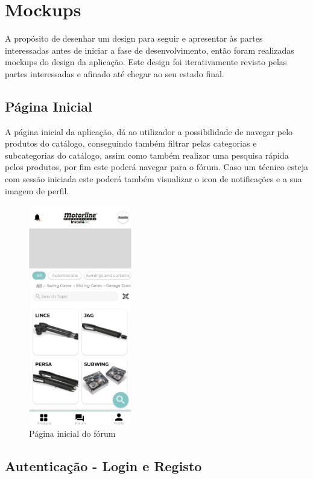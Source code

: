 \section{Mockups}
A propósito de desenhar um design para seguir e apresentar às partes interessadas antes de iniciar a 
fase de desenvolvimento, então foram realizadas mockups do design da aplicação. Este design foi 
iterativamente revisto pelas partes interessadas e afinado até chegar ao seu estado final.

\subsection{Página Inicial}

A página inicial da aplicação, dá ao utilizador a possibilidade de navegar pelo produtos do catálogo,
conseguindo também filtrar pelas categorias e subcategorias do catálogo, 
assim como também realizar uma pesquisa rápida pelos produtos, por fim este poderá navegar para o fórum.
Caso um técnico esteja com sessão iniciada este poderá também visualizar o icon de notificações e a sua 
imagem de perfil.

\begin{figure}[htb]
    \centering
    \includegraphics[width=0.4\textwidth]{images/mockups/home_screen.png}
    \caption{Página inicial do fórum}
    \label{fig:16}
\end{figure}

\newpage

\subsection{Autenticação - Login e Registo}

